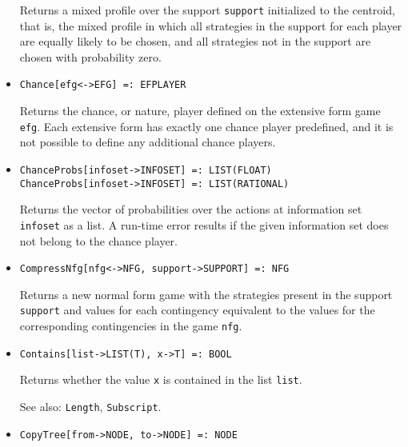 \begin{itemize}
\bd
Returns a mixed profile over the support \verb+support+
initialized to the centroid, that is, the mixed profile in which 
all strategies in the support for each player are equally likely to be
chosen, and all strategies not in the support are chosen with probability
zero.
\ed

\item
\protect \large \begin{verbatim}
Chance[efg<->EFG] =: EFPLAYER
\end{verbatim}\normalsize

\bd
Returns the chance, or nature, player defined on the
extensive form game \verb+efg+.  Each extensive form has exactly one
chance player predefined, and it is not possible to define any additional
chance players.
\ed

\item
\protect \large \begin{verbatim}
ChanceProbs[infoset->INFOSET] =: LIST(FLOAT)
ChanceProbs[infoset->INFOSET] =: LIST(RATIONAL)
\end{verbatim}\normalsize

\bd
Returns the vector of probabilities over the actions at
information set \verb+infoset+ as a list.  A run-time error results if
the given information set does not belong to the chance player.
\ed

\item
\protect \large \begin{verbatim}
CompressNfg[nfg<->NFG, support->SUPPORT] =: NFG
\end{verbatim}\normalsize

\bd
Returns a new normal form game with the strategies present
in the support \verb+support+ and values for each contingency equivalent
to the values for the corresponding contingencies in the game \verb+nfg+.
\ed

\item
\protect \large \begin{verbatim}
Contains[list->LIST(T), x->T] =: BOOL
\end{verbatim}\normalsize

\bd
Returns whether the value \verb+x+ is contained in the list
\verb+list+.
\item
[See also:] {\tt Length}, {\tt Subscript}.
\ed

\item
\protect \large \begin{verbatim}
CopyTree[from->NODE, to->NODE] =: NODE
\end{verbatim}\normalsize


\end{itemize}
